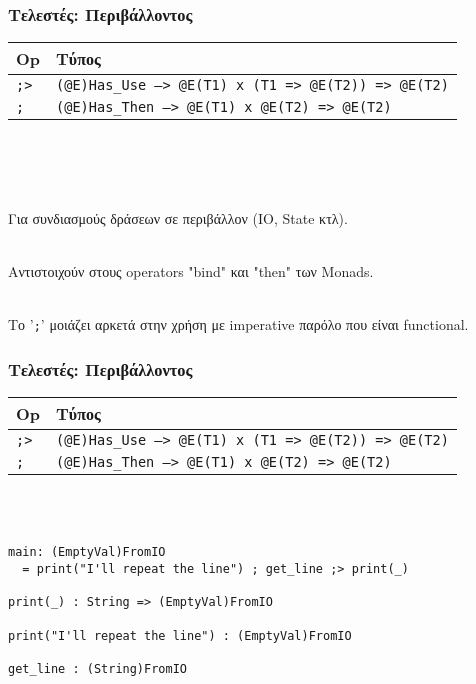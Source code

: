\documentclass{beamer}
\def\e{\foreignlanguage{english}}
\begin{document}
\begin{frame}

\frametitle{Τελεστές: Περιβάλλοντος}

\begin{center}
\begin{tabular}{ |P{0.4cm}|P{9.9cm}| }
 \hline
 \e{Op} & Τύπος
 \\
 \hline
 \e{\texttt{;>}} & \e{\texttt{(@E)Has\_Use --> @E(T1) x (T1 => @E(T2)) => @E(T2)}}
 \\
 \e{\texttt{;}} & \e{\texttt{(@E)Has\_Then --> @E(T1) x @E(T2) => @E(T2)}}
 \\
 \hline
\end{tabular}
\\~\
\\~\
\end{center}

\pause
Για συνδιασμούς δράσεων σε περιβάλλον (\e{IO, State} κτλ).
\\~\

Αντιστοιχούν στους \e{operators "bind"} και \e{"then"} των \e{Monads}.
\\~\

Το '\e{\texttt{;}}' μοιάζει αρκετά στην χρήση με \e{imperative} παρόλο που
είναι \e{functional}.
\end{frame}

\begin{frame}[fragile]

\frametitle{Τελεστές: Περιβάλλοντος}

\begin{center}
\begin{tabular}{ |P{0.4cm}|P{9.9cm}| }
 \hline
 \e{Op} & Τύπος
 \\
 \hline
 \e{\texttt{;>}} & \e{\texttt{(@E)Has\_Use --> @E(T1) x (T1 => @E(T2)) => @E(T2)}}
 \\
 \e{\texttt{;}} & \e{\texttt{(@E)Has\_Then --> @E(T1) x @E(T2) => @E(T2)}}
 \\
 \hline
\end{tabular}
\\~\
\end{center}
\begin{otherlanguage}{english}
\begin{verbatim}
main: (EmptyVal)FromIO
  = print("I'll repeat the line") ; get_line ;> print(_)

print(_) : String => (EmptyVal)FromIO

print("I'll repeat the line") : (EmptyVal)FromIO

get_line : (String)FromIO

\end{verbatim}
\end{otherlanguage}

\end{frame}
\end{document}
